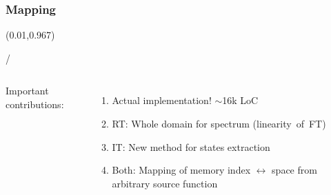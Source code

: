 \documentclass{beamer}
\makeatletter
\newcommand{\framenumber}{
\begin{textblock}{0}(0.01,0.967)
\begin{scriptsize}
{\color{gray}\insertframenumber/\inserttotalframenumber}
\end{scriptsize}
\end{textblock}
}
\makeatother
\begin{document}
\subsubsection{Mapping}
\begin{frame}{}\framenumber{}

    \begin{columns}[t]
        Important contributions:
        \begin{enumerate}
            \item<+-> Actual implementation! $\sim$16k LoC
            \item<+-> RT: Whole domain for spectrum (linearity~of~FT)
            \item<+-> IT: New method for states extraction
            \item<+-> Both: Mapping of memory index $\leftrightarrow$ space from arbitrary source function
        \end{enumerate}

    \begin{center}
        {}\\
        {}\\
        {}\\
    \end{center}


\end{columns}
\end{frame}
\end{document}
